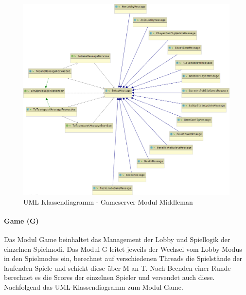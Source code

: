 \documentclass[11pt,ngerman]{article}
\begin{document}
	\begin{figure}[H]
    	\centering
    	\includegraphics[scale=0.2]{figures/gameserver-uml/middleman-classes.png}
    	\caption{UML Klassendiagramm - Gameserver Modul Middleman}
    	\label{fig:UMLModulMiddleman}
    \end{figure}

    \paragraph{Game (G)}
	Das Modul Game beinhaltet das Management der \Gls{Lobby} und Spiellogik der einzelnen Spielmodi. Das Modul G leitet jeweils der Wechsel vom \Gls{Lobby}-Modus in den Spielmodus ein, berechnet auf verschiedenen Threads die Spielstände der laufenden Spiele und schickt diese über M an T. Nach Beenden einer Runde berechnet es die Scores der einzelnen Spieler und versendet auch diese. Nachfolgend das UML-Klassendiagramm zum Modul Game.
\end{document}

